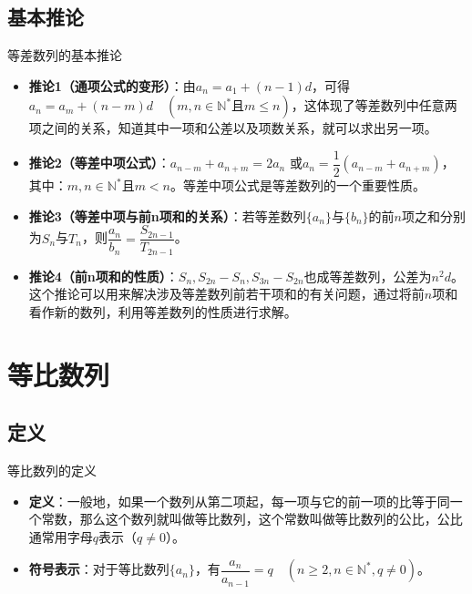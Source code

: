 \documentclass[aspectratio=169]{ctexbeamer} %
\begin{document}
\subsection{基本推论}
\begin{frame}{等差数列的基本推论}
\begin{itemize}
\item \textbf{推论1（通项公式的变形）}：由$a_n = a_1 + (n - 1)d$，可得$a_n = a_m + (n - m)d\quad(m, n \in \mathbb{N}^* \text{且} m \leq n)$，这体现了等差数列中任意两项之间的关系，知道其中一项和公差以及项数关系，就可以求出另一项。
\item \textbf{推论2（等差中项公式）}：$a_{n-m} + a_{n+m} = 2a_n$ 或$a_n = \dfrac{1}{2}(a_{n-m} + a_{n+m})$，其中：$m, n \in \mathbb{N}^* \text{且} m < n$。等差中项公式是等差数列的一个重要性质。
\item \textbf{推论3（等差中项与前n项和的关系）}：若等差数列$\{a_n\}$与$\{b_n\}$的前$n$项之和分别为$S_n$与$T_n$，则$\dfrac{a_n}{b_n} =\dfrac{S_{2n-1}}{T_{2n-1}}$。
\item \textbf{推论4（前n项和的性质）}：$S_n, S_{2n} - S_n, S_{3n} - S_{2n}$也成等差数列，公差为$n^2 d$。这个推论可以用来解决涉及等差数列前若干项和的有关问题，通过将前$n$项和看作新的数列，利用等差数列的性质进行求解。
\end{itemize}
\end{frame}

\section{等比数列}
\subsection{定义}
\begin{frame}{等比数列的定义}
\begin{itemize}
\item \textbf{定义}：一般地，如果一个数列从第二项起，每一项与它的前一项的比等于同一个常数，那么这个数列就叫做等比数列，这个常数叫做等比数列的公比，公比通常用字母$q$表示（$q \neq 0$）。
\item \textbf{符号表示}：对于等比数列$\{a_n\}$，有$\dfrac{a_n}{a_{n-1}} = q\quad(n \geq 2, n \in \mathbb{N}^*, q \neq 0)$。
\end{itemize}
\end{frame}
\end{document}
